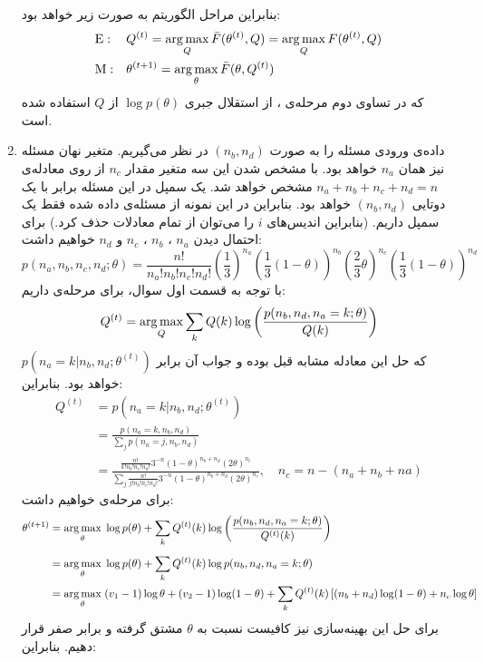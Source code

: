 \documentclass[a4paper, 12pt]{article}
\begin{document}
\begin{enumerate}
	بنابراین مراحل الگوریتم  به صورت زیر خواهد بود:
	\[
	\begin{aligned}
		&\text{E}: && Q^{(t)} = \operatorname*{arg\,max}_Q \bar{F}(\theta^{(t)}, Q) = \operatorname*{arg\,max}_Q F(\theta^{(t)}, Q) \\
		&\text{M}: && \theta^{(t+1)} = \operatorname*{arg\,max}_\theta \bar{F}(\theta, Q^{(t)})
	\end{aligned}
	\]
	که در تساوی دوم مرحله‌ی ، از استقلال جبری $\log p(\theta)$ از $Q$ استفاده شده است.
	\item
	داده‌ی ورودی مسئله را به صورت
	$(n_b, n_d)$
	در نظر می‌گیریم. متغیر نهان مسئله نیز همان $n_a$ خواهد بود. با مشخص شدن این سه متغیر مقدار $n_c$ از روی معادله‌ی 
	$n_a + n_b + n_c + n_d = n$
	مشخص خواهد شد. یک سمپل در این مسئله برابر با یک دوتایی $(n_b, n_d)$ خواهد بود. بنابراین در این نمونه از مسئله‌ی داده شده فقط یک سمپل داریم. (بنابراین اندیس‌های $i$ را می‌توان از تمام معادلات حذف کرد.) برای احتمال دیدن $n_a$
	، $n_b$
	، $n_c$
	و $n_d$ خواهیم داشت:
	\[
	p(n_a, n_b, n_c, n_d; \theta) = \frac{n!}{n_a!n_b!n_c!n_d!} \left(\frac{1}{3}\right)^{n_a}\left(\frac{1}{3}(1-\theta)\right)^{n_b} \left(\frac{2}{3}\theta\right)^{n_c} \left(\frac{1}{3}(1-\theta)\right)^{n_d}
	\]
	با توجه به قسمت اول سوال، برای مرحله‌ی  داریم:
	\[
	Q^{(t)} = \operatorname*{arg\,max}_Q \sum_k Q(k) \log\left(\frac{p(n_b, n_d, n_a=k; \theta)}{Q(k)}\right)
	\]
	که حل این معادله مشابه قبل بوده و جواب آن برابر
	$p(n_a=k|n_b, n_d; \theta^{(t)})$
	خواهد بود. بنابراین:
	\[
	\begin{aligned}
		Q^{(t)} &= p(n_a=k|n_b,n_d; \theta^{(t)}) \\[0.6em]
		&= \frac{p(n_a=k, n_b, n_d)}{\sum_j p(n_a=j, n_b, n_d)} \\[0.6em]
		&= \frac{\frac{n!}{k!n_b!n_c!n_d!}3^{-n}(1-\theta)^{n_b+n_d}(2\theta)^{n_c}} {\sum_j \frac{n!}{j!n_b!n_c!n_d!}3^{-n}(1-\theta)^{n_b+n_d}(2\theta)^{n_c}}, \quad n_c = n - (n_a+n_b+na)
	\end{aligned}
	\]
	برای مرحله‌ی  خواهیم داشت:
	\[
	\begin{aligned}
		\theta^{(t+1)} &= \operatorname*{arg\,max}_\theta \; \log p(\theta) + \sum_k Q^{(t)}(k)\log\left(\frac{p(n_b, n_d, n_a=k; \theta)}{Q^{(t)}(k)}\right) \\[0.5em]
		&= \operatorname*{arg\,max}_\theta \; \log p(\theta) + \sum_k Q^{(t)}(k) \log p(n_b, n_d, n_a=k; \theta) \\
		&= \operatorname*{arg\,max}_\theta \; (v_1-1)\log \theta + (v_2-1)\log(1-\theta) + \sum_k Q^{(t)}(k) \left[(n_b+n_d)\log(1-\theta) + n_c\log\theta\right]
	\end{aligned}
	\]
	برای حل این بهینه‌سازی نیز کافیست نسبت به $\theta$ مشتق گرفته و برابر صفر قرار دهیم. بنابراین:

\end{enumerate}
\end{document}
